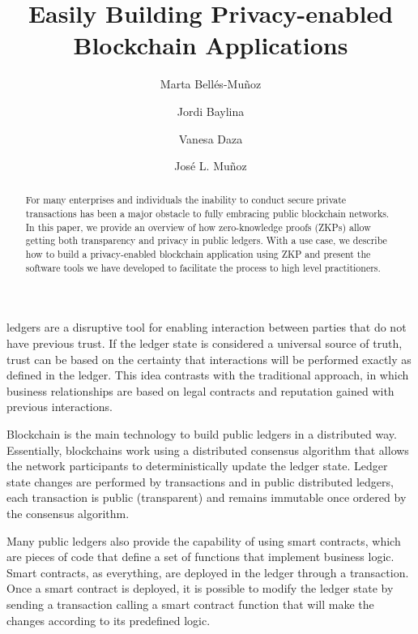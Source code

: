 \documentclass{IEEEcsmag}
\begin{document}

\title{Easily Building Privacy-enabled Blockchain Applications}

\author{Marta Bell\'es-Mu\~noz}

\author{Jordi Baylina}

\author{Vanesa Daza}

\author{Jos\'e L. Mu\~noz}


\begin{abstract}
For many enterprises and individuals the inability to conduct secure 
private transactions has been a major obstacle to 
fully embracing public blockchain networks. 
In this paper, we provide an overview of how zero-knowledge proofs (ZKPs)
allow getting both transparency and privacy in public ledgers.
With a use case, we describe how to build a privacy-enabled 
blockchain application using ZKP and present the software tools 
we have developed to facilitate the process to high level practitioners. 
\end{abstract} 


\maketitle
{} ledgers are a disruptive tool for enabling interaction
between parties that do not have previous trust.
If the ledger state is considered a universal source of truth,
trust can be based on the certainty that interactions 
will be performed exactly as defined in the ledger.
This idea contrasts with the traditional approach, in which business relationships are 
based on legal contracts and reputation gained with previous interactions. 

Blockchain is the main technology to build 
public ledgers in a distributed way.
Essentially, blockchains work using a
distributed consensus algorithm that allows 
the network participants to deterministically update the
ledger state.
Ledger state changes are performed by transactions and in public distributed ledgers, 
each transaction is public (transparent) and 
remains immutable once ordered by the consensus algorithm. 

Many public ledgers also provide the capability of using smart contracts, which are pieces of code that define a set of
functions that implement business logic.
Smart contracts, as everything, are deployed in the ledger through a transaction. 
Once a smart contract is deployed, 
it is possible to modify the ledger 
state by sending a transaction calling a smart contract function that will make 
the changes according to its predefined logic.
\end{document}

